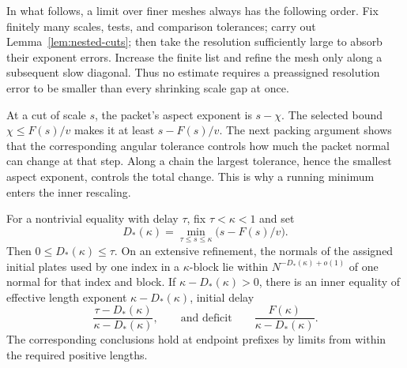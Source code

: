 In what follows, a limit over finer meshes always has the following
order. Fix finitely many scales, tests, and comparison tolerances; carry
out Lemma~\ref{lem:nested-cuts}; then take the resolution sufficiently
large to absorb their exponent errors. Increase the finite list and
refine the mesh only along a subsequent slow diagonal. Thus no estimate
requires a preassigned resolution error to be smaller than every
shrinking scale gap at once.

At a cut of scale $s$, the packet's aspect exponent is $s-\chi$.
The selected bound $\chi\le F(s)/v$ makes it at least
$s-F(s)/v$. The next packing argument shows that the corresponding
angular tolerance controls how much the packet normal can change at
that step. Along a chain the largest tolerance, hence the smallest
aspect exponent, controls the total change. This is why a running
minimum enters the inner rescaling.

\begin{lemma}
\label{lem:angle-packing}
For a nontrivial equality with delay $\tau$, fix $\tau<\kappa<1$ and set
\begin{equation}
 D_*(\kappa)=\min_{\tau\le s\le\kappa}
                   \bigl(s-F(s)/v\bigr).
 \label{eq:running-orientation-exponent}
\end{equation}
Then $0\le D_*(\kappa)\le\tau$. On an extensive refinement, the normals
of the assigned initial plates used by one index in a $\kappa$-block lie
within $N^{-D_*(\kappa)+o(1)}$ of one normal for that index and block.
If $\kappa-D_*(\kappa)>0$, there is an inner equality of effective
length exponent $\kappa-D_*(\kappa)$, initial delay
\begin{equation}
 \frac{\tau-D_*(\kappa)}{\kappa-D_*(\kappa)},
 \qquad\text{and deficit}\qquad
 \frac{F(\kappa)}{\kappa-D_*(\kappa)}.
 \label{eq:inner-delay-deficit}
\end{equation}
The corresponding conclusions hold at endpoint prefixes by limits from
within the required positive lengths.
\end{lemma}

